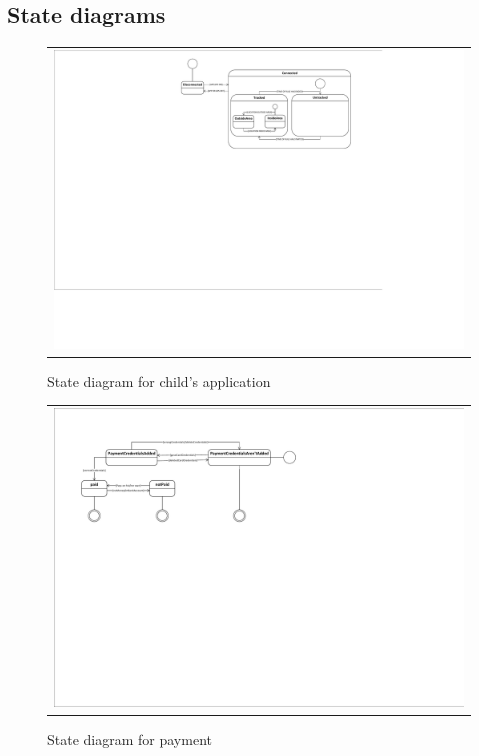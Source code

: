 \documentclass{sprawozdanie-agh}
\begin{document}
		\subsection{State diagrams}
		
		\begin{figure}[H]
			\centering
			\begin{tabular}{c}
				\includegraphics[width=.95\textwidth]{Stanu_cropped} 
			\end{tabular}
			\caption{State diagram for child's application}
		\end{figure}
 
		\begin{figure}[H]
			\centering 
			\begin{tabular}{c}
				\includegraphics[width=.95\textwidth]{paymentStateDiagram} 
			\end{tabular}
			\caption{State diagram for payment}
		\end{figure}
\end{document}
